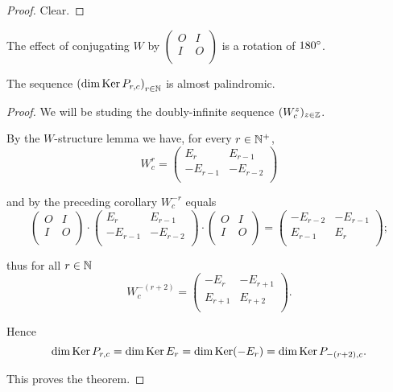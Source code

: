 \begin{proof}
  Clear.
\end{proof}

\begin{remark}
  The effect of conjugating $W$ by
  $\left(\begin{smallmatrix} O & I \\ I & O \\\end{smallmatrix}\right)$
  is a rotation of $180^{\circ}$.
\end{remark}

\begin{theorem}
  The sequence $\left(\dim\operatorname{Ker} P_{r,c}\right)_{r\in\mathbb{N}}$
  is almost palindromic.
\end{theorem}

\begin{proof}
  We will be studing the doubly-infinite sequence
  $(W_{c}^{z})_{z\in\mathbb{Z}}$.

  By the $W$-structure lemma we have, for every $r\in\mathbb{N}^{+}$,
  \[
  W_{c}^{r}
  =
  \left(
  \begin{array}{cc}
     E_{r} &  E_{r-1}  \\
    -E_{r-1} & -E_{r-2} \\
  \end{array}
  \right)
  \]

  and by the preceding corollary $W_{c}^{-r}$ equals
  \[
  \left(
  \begin{array}{cc}
    O & I \\
    I & O \\
  \end{array}
  \right)
  \cdot
  \left(
  \begin{array}{cc}
     E_{r} &  E_{r-1}  \\
    -E_{r-1} & -E_{r-2} \\
  \end{array}
  \right)
  \cdot
  \left(
  \begin{array}{cc}
    O & I \\
    I & O \\
  \end{array}
  \right)
  =
  \left(
  \begin{array}{cc}
    -E_{r-2}  & -E_{r-1} \\
     E_{r-1} & E_{r}     \\
  \end{array}
  \right);
  \]

  thus for all $r\in\mathbb{N}$
  \[
  W_{c}^{-(r+2)}
  =
  \left(
  \begin{array}{cc}
    -E_{r}  & -E_{r+1} \\
     E_{r+1} & E_{r+2} \\
  \end{array}
  \right).
  \]

  Hence
  \[
  \dim\operatorname{Ker} P_{r,c} =
  \dim\operatorname{Ker} E_{r} =
  \dim\operatorname{Ker}(-E_{r}) =
  \dim\operatorname{Ker} P_{-(r+2),c}.
  \]

  This proves the theorem.
\end{proof}

